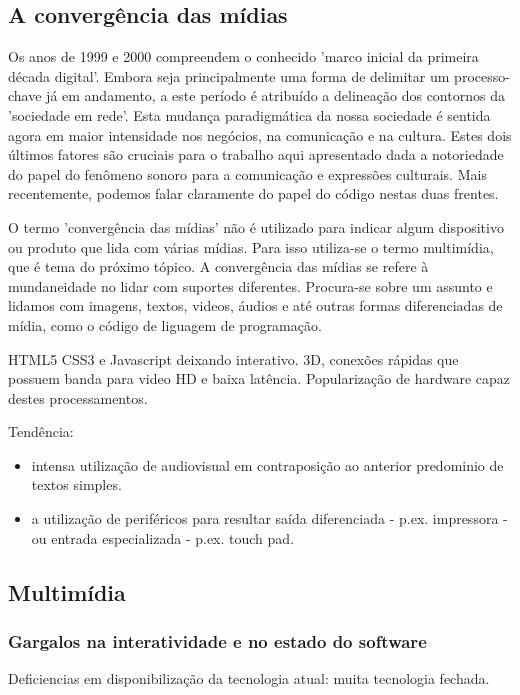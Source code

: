   \subsection{A convergência das mídias}
  \label{sec:midiamultimidia}

Os anos de 1999 e 2000 compreendem o conhecido 'marco inicial da primeira década digital'.
Embora seja principalmente uma forma de delimitar um processo-chave já em andamento, a este período é atribuído
a delineação dos contornos da 'sociedade em rede'. Esta mudança paradigmática da nossa
sociedade é sentida agora em maior intensidade nos negócios, na comunicação e na cultura. Estes dois
últimos fatores são cruciais para o trabalho aqui apresentado dada a notoriedade do papel do
fenômeno sonoro para a comunicação e expressões culturais. Mais recentemente, podemos falar claramente
do papel do código nestas duas frentes.

O termo 'convergência das mídias' não é utilizado para indicar algum dispositivo ou produto que
lida com várias mídias. Para isso utiliza-se o termo multimídia, que é tema do próximo tópico.
A convergência das mídias se refere à mundaneidade no lidar com suportes diferentes. Procura-se
sobre um assunto e lidamos com imagens, textos, videos, áudios e até outras formas diferenciadas
de mídia, como o código de liguagem de programação.


HTML5 CSS3 e Javascript deixando interativo. 3D, conexões rápidas que possuem banda para video HD e
baixa latência. Popularização de hardware capaz destes processamentos.

Tendência:
\begin{itemize}
    \item intensa utilização de audiovisual em contraposição ao
anterior predominio de textos simples.
    \item a utilização de periféricos para resultar saída diferenciada - p.ex.
impressora - ou entrada especializada - p.ex. touch pad.
\end{itemize}


  \subsection{Multimídia}

    \subsubsection{Gargalos na interatividade e no estado do software}
    \label{sec:gargalos}
Deficiencias em disponibilização da tecnologia atual: muita
tecnologia fechada.

